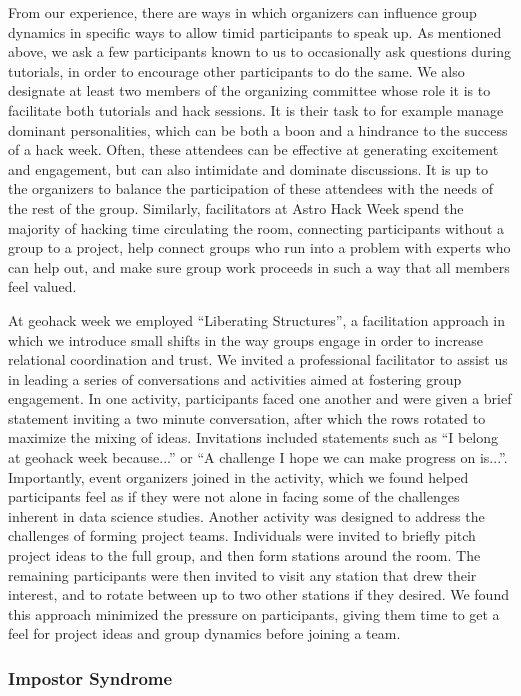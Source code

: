\documentclass{aastex62}
\begin{document}
From our experience, there are ways in which organizers can influence group dynamics in specific ways to allow timid participants to speak up. As mentioned above, we ask a few participants known to us to occasionally ask questions during tutorials, in order to encourage other participants to do the same. We also designate at least two members of the organizing committee whose role it is to facilitate both tutorials and hack sessions. It is their task to for example manage dominant personalities, which can be both a boon and a hindrance to the success of a hack week. Often, these attendees can be effective at generating excitement and engagement, but can also intimidate and dominate discussions. It is up to the organizers to balance the participation of these attendees with the needs of the rest of the group. Similarly, facilitators at Astro Hack Week spend the majority of hacking time circulating the room, connecting participants without a group to a project, help connect groups who run into a problem with experts who can help out, and make sure group work proceeds in such a way that all members feel valued.

At geohack week we employed ``Liberating Structures'', a facilitation approach in which we introduce small shifts in the way groups engage in order to increase relational coordination and trust. We invited a professional facilitator to assist us in leading a series of conversations and activities aimed at fostering group engagement. In one activity, participants faced one another and were given a brief statement inviting a two minute conversation, after which the rows rotated to maximize the mixing of ideas. Invitations included statements such as ``I belong at geohack week because...'' or ``A challenge I hope we can make progress on is...''. Importantly, event organizers joined in the activity, which we found helped participants feel as if they were not alone in facing some of the challenges inherent in data science studies. Another activity was designed to address the challenges of forming project teams. Individuals were invited to briefly pitch project ideas to the full group, and then form stations around the room. The remaining participants were then invited to visit any station that drew their interest, and to rotate between up to two other stations if they desired. We found this approach minimized the pressure on participants, giving them time to get a feel for project ideas and group dynamics before joining a team. 


\subsubsection{Impostor Syndrome}
\end{document}
